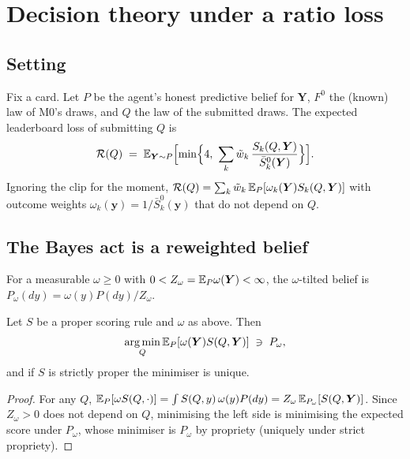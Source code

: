 \section{Decision theory under a ratio loss}\label{sec:ratio}

\subsection{Setting}

Fix a card. Let $P$ be the agent's honest predictive belief for $\bm Y$, $F^0$ the (known) law of M0's draws, and $Q$ the law of the submitted
draws. The expected leaderboard loss of submitting $Q$ is
\begin{equation}\label{eq:risk}
  \mathcal R(Q) \;=\; \mathbb{E}_{\bm Y\sim P}\Bigl[\min\Bigl\{4,\ \sum_k \tilde w_k\, \frac{S_k(Q,\bm Y)}{\bar S_k^0(\bm Y)}\Bigr\}\Bigr].
\end{equation}
Ignoring the clip for the moment, $\mathcal R(Q)=\sum_k\tilde w_k\,\mathbb{E}_P[\omega_k(\bm Y)S_k(Q,\bm Y)]$ with outcome weights
$\omega_k(\bm y)=1/\bar S^0_k(\bm y)$ that do not depend on $Q$.

\subsection{The Bayes act is a reweighted belief}

\begin{definition}
For a measurable $\omega\ge0$ with $0<Z_\omega=\mathbb{E}_P\omega(\bm Y)<\infty$, the $\omega$-tilted belief is $P_\omega(dy)=\omega(y)P(dy)/Z_\omega$.
\end{definition}

\begin{theorem}\label{thm:bayes}
Let $S$ be a proper scoring rule and $\omega$ as above. Then
\begin{equation}
  \operatorname*{arg\,min}_Q \mathbb{E}_P[\omega(\bm Y) S(Q,\bm Y)] \;\ni\; P_\omega,
\end{equation}
and if $S$ is strictly proper the minimiser is unique.
\end{theorem}
\begin{proof}
For any $Q$, $\mathbb{E}_P[\omega S(Q,\cdot)]=\int S(Q,y)\,\omega(y)P(dy)=Z_\omega\,\mathbb{E}_{P_\omega}[S(Q,\bm Y)]$. Since $Z_\omega>0$ does not depend on $Q$,
minimising the left side is minimising the expected score under $P_\omega$, whose minimiser is $P_\omega$ by propriety (uniquely under strict
propriety).
\end{proof}

